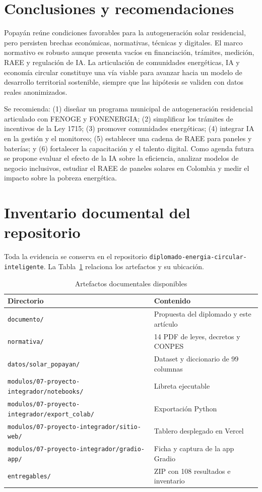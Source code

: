 \documentclass[journal]{IEEEtran}
\begin{document}
\section{Conclusiones y recomendaciones}
Popayán reúne condiciones favorables para la autogeneración solar residencial, pero persisten brechas económicas, normativas, técnicas y digitales. El marco normativo es robusto aunque presenta vacíos en financiación, trámites, medición, RAEE y regulación de IA. La articulación de comunidades energéticas, IA y economía circular constituye una vía viable para avanzar hacia un modelo de desarrollo territorial sostenible, siempre que las hipótesis se validen con datos reales anonimizados.

Se recomienda: (1) diseñar un programa municipal de autogeneración residencial articulado con FENOGE y FONENERGIA; (2) simplificar los trámites de incentivos de la Ley 1715; (3) promover comunidades energéticas; (4) integrar IA en la gestión y el monitoreo; (5) establecer una cadena de RAEE para paneles y baterías; y (6) fortalecer la capacitación y el talento digital. Como agenda futura se propone evaluar el efecto de la IA sobre la eficiencia, analizar modelos de negocio inclusivos, estudiar el RAEE de paneles solares en Colombia y medir el impacto sobre la pobreza energética.

\appendices
\section{Inventario documental del repositorio}
Toda la evidencia se conserva en el repositorio \texttt{diplomado-energia-circular-inteligente}. La Tabla~\ref{tab:artefactos} relaciona los artefactos y su ubicación.

\begin{table}[t]
\caption{Artefactos documentales disponibles}
\label{tab:artefactos}
\centering
\footnotesize
\begin{tabular}{@{}ll@{}}
\toprule
Directorio & Contenido \\
\midrule
\texttt{documento/} & Propuesta del diplomado y este artículo \\
\texttt{normativa/} & 14 PDF de leyes, decretos y CONPES \\
\texttt{datos/solar\_popayan/} & Dataset y diccionario de 99 columnas \\
\texttt{modulos/07-proyecto-integrador/notebooks/} & Libreta ejecutable \\
\texttt{modulos/07-proyecto-integrador/export\_colab/} & Exportación Python \\
\texttt{modulos/07-proyecto-integrador/sitio-web/} & Tablero desplegado en Vercel \\
\texttt{modulos/07-proyecto-integrador/gradio-app/} & Ficha y captura de la app Gradio \\
\texttt{entregables/} & ZIP con 108 resultados e inventario \\
\bottomrule
\end{tabular}
\end{table}
\end{document}

